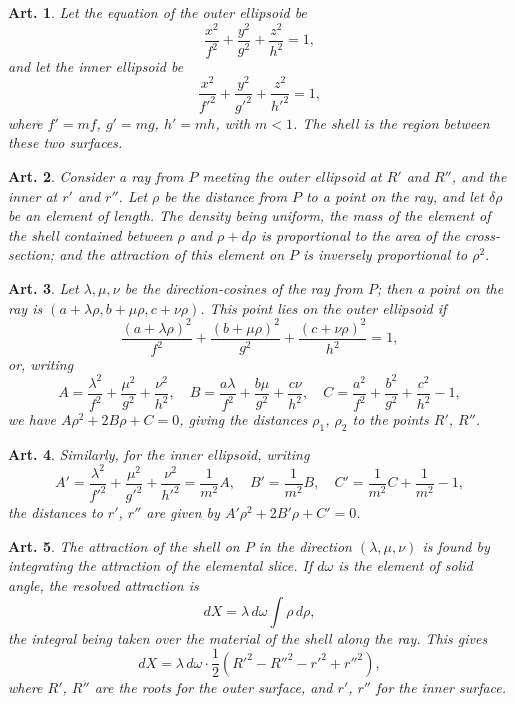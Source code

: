 \documentclass[12pt,a4paper]{article}
\theoremstyle{cayley}
\newtheorem{art}{Art.}[section]
\begin{document}
\begin{art}
Let the equation of the outer ellipsoid be
\[
\frac{x^2}{f^2} + \frac{y^2}{g^2} + \frac{z^2}{h^2} = 1,
\]
and let the inner ellipsoid be
\[
\frac{x^2}{f'^2} + \frac{y^2}{g'^2} + \frac{z^2}{h'^2} = 1,
\]
where $f' = mf$, $g' = mg$, $h' = mh$, with $m < 1$. The shell is the region between these two surfaces.
\end{art}

\begin{art}
Consider a ray from $P$ meeting the outer ellipsoid at $R'$ and $R''$, and the inner at $r'$ and $r''$. Let $\rho$ be the distance from $P$ to a point on the ray, and let $\delta\rho$ be an element of length. The density being uniform, the mass of the element of the shell contained between $\rho$ and $\rho + d\rho$ is proportional to the area of the cross-section; and the attraction of this element on $P$ is inversely proportional to $\rho^2$.
\end{art}

\begin{art}
Let $\lambda, \mu, \nu$ be the direction-cosines of the ray from $P$; then a point on the ray is $(a + \lambda\rho, b + \mu\rho, c + \nu\rho)$. This point lies on the outer ellipsoid if
\[
\frac{(a + \lambda\rho)^2}{f^2} + \frac{(b + \mu\rho)^2}{g^2} + \frac{(c + \nu\rho)^2}{h^2} = 1,
\]
or, writing
\[
A = \frac{\lambda^2}{f^2} + \frac{\mu^2}{g^2} + \frac{\nu^2}{h^2},\quad
B = \frac{a\lambda}{f^2} + \frac{b\mu}{g^2} + \frac{c\nu}{h^2},\quad
C = \frac{a^2}{f^2} + \frac{b^2}{g^2} + \frac{c^2}{h^2} - 1,
\]
we have $A\rho^2 + 2B\rho + C = 0$, giving the distances $\rho_1$, $\rho_2$ to the points $R'$, $R''$.
\end{art}

\begin{art}
Similarly, for the inner ellipsoid, writing
\[
A' = \frac{\lambda^2}{f'^2} + \frac{\mu^2}{g'^2} + \frac{\nu^2}{h'^2}
= \frac{1}{m^2}A,\quad
B' = \frac{1}{m^2}B,\quad
C' = \frac{1}{m^2}C + \frac{1}{m^2} - 1,
\]
the distances to $r'$, $r''$ are given by $A'\rho^2 + 2B'\rho + C' = 0$.
\end{art}

\begin{art}
The attraction of the shell on $P$ in the direction $(\lambda, \mu, \nu)$ is found by integrating the attraction of the elemental slice. If $d\omega$ is the element of solid angle, the resolved attraction is
\[
dX = \lambda\,d\omega\int \rho\,d\rho,
\]
the integral being taken over the material of the shell along the ray. This gives
\[
dX = \lambda\,d\omega \cdot \frac{1}{2}(R'^2 - R''^2 - r'^2 + r''^2),
\]
where $R'$, $R''$ are the roots for the outer surface, and $r'$, $r''$ for the inner surface.
\end{art}
\end{document}

